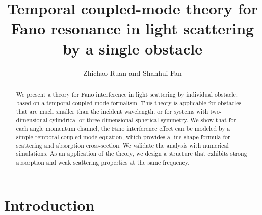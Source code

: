 \documentclass[preprint,aps]{revtex4}
\begin{document}
\title{Temporal coupled-mode theory for Fano resonance in light scattering by a
single obstacle}
\author{Zhichao Ruan and Shanhui Fan}



\begin{abstract}
We present a theory for Fano interference in light scattering by
individual obstacle, based on a temporal coupled-mode formalism.
This theory is applicable for obstacles that are much smaller than
the incident wavelength, or for systems with two-dimensional
cylindrical or three-dimensional spherical symmetry. We show that
for each angle momentum channel, the Fano interference effect can be
modeled by a simple temporal coupled-mode equation, which provides a
line shape formula for scattering  and absorption cross-section. We
validate the analysis with numerical simulations. As an application
of the theory, we design a structure that exhibits strong absorption
and weak scattering properties at the same frequency.


\end{abstract}




\maketitle

\section{Introduction}
\end{document}
